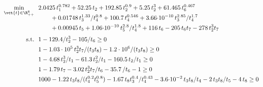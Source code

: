 
\begin{align*}
    \min_{\vct{t} \in \R^8_{++}} ~~& 2.0425\, t_{1}^{0.782} + 52.25\, t_{2} + 192.85\, t_{2}^{0.9} + 5.25\, t_{2}^3 + 61.465\, t_{6}^{0.467} \\[-0.75em]
    & \qquad + 0.01748\,  t_{3}^{1.33} / t_{4}^{0.8} + 100.7\, t_{4}^{0.546} + 3.66 {\cdot 10}^{-10} \, t_{3}^{2.85}/ t_{4}^{1.7} \\
    & \qquad + 0.00945\, t_{5} + 1.06 {\cdot 10}^{-10}\, t_{5}^{2.8}/t_{4}^{1.8} + 116\, t_{6} - 205\, t_{6} t_{7} - 278\, t_{2}^3 t_{7} \\[0.25em]
    \text{s.t.}~~ & 1 - 129.4/t_{2}^3 - 105/t_{6} \geq 0 \\
    & 1 - 1.03\cdot 10^5 \, t_{2}^3 t_{7}/(t_{3} t_{8}) - 1.2\cdot 10^6 /(t_{3} t_{8}) \geq 0 \\
    & 1 - 4.68\, t_{2}^3/t_{1} - 61.3\, t_{2}^2/t_{1} - 160.5\, t_{2}/t_{1} \geq 0 \\
    & 1 - 1.79\, t_{7} - 3.02\, t_{2}^3 t_{7}/t_{6} - 35.7\, /t_{6} - 1 \geq 0 \\
    & 1000 - 1.22\, t_{3} t_{8}/(t_{4}^{0.2} t_{5}^{0.8}) - 1.67\, t_{8} t_{3}^{0.4}/ t_{4}^{0.43} - 3.6 {\cdot 10}^{-2}\, t_{3} t_{8}/t_{4} - 2\, t_{3} t_{8}/t_{5} - 4\, t_{8} \geq 0
\end{align*}
